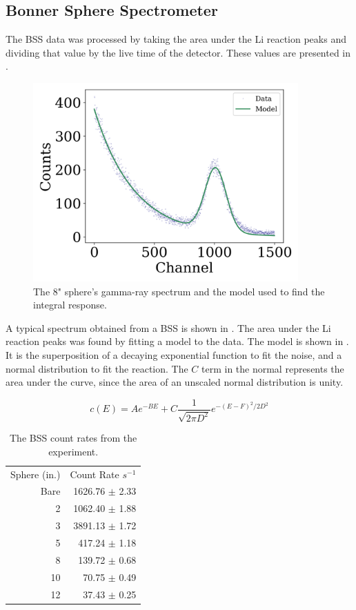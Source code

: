 \clearpage

\subsection{Bonner Sphere Spectrometer}

The BSS data was processed by taking the area under the Li reaction peaks and dividing that value by the live time of the detector.
These values are presented in .

\begin{figure}[htb]
\centering
\includegraphics[height=3in]{tex/figures/bs4_spectrum.png}
\caption[8" BSS Spectrum]{The 8" sphere's gamma-ray spectrum and the model used to find the integral response.}
\label{fig:bs4_spectrum}
\end{figure}

A typical spectrum obtained from a BSS is shown in .
The area under the Li reaction peaks was found by fitting a model to the data.
The model is shown in .
It is the superposition of a decaying exponential function to fit the noise, and a normal distribution to fit the reaction.
The $C$ term in the normal represents the area under the curve, since the area of an unscaled normal distribution is unity.

\begin{equation}
\label{eqn:model}
c(E) = A e^{-BE} + C \frac{1}{\sqrt{2 \pi D^2}} e^{-(E - F)^2 / 2 D^2}
\end{equation}


\begin{table}[h]\centering
\label{tab:bss}
\caption{The BSS count rates from the experiment.}
\begin{tabular}{ r | r }
\toprule
Sphere (in.)  & Count Rate $s^{-1}$\\
Bare & 1626.76 $\pm$ 2.33\\
2  & 1062.40 $\pm$ 1.88\\
3 & 3891.13 $\pm$ 1.72\\
5 & 417.24 $\pm$ 1.18\\
8 & 139.72 $\pm$ 0.68\\
10 & 70.75 $\pm$ 0.49\\
12 & 37.43 $\pm$ 0.25\\
\end{tabular}
\end{table}

